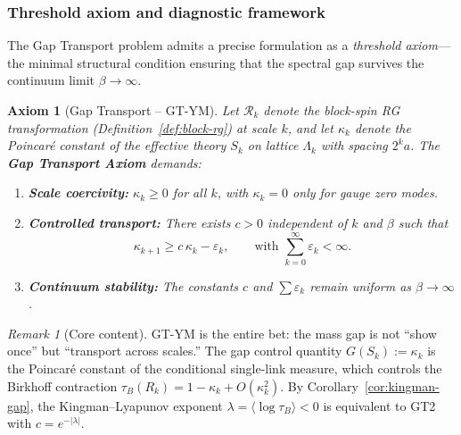 \documentclass[12pt,a4paper]{article}
\theoremstyle{definition}
\theoremstyle{plain}
\newtheorem{axiom}[definition]{Axiom}
\theoremstyle{remark}
\newtheorem{remark}[definition]{Remark}
\begin{document}
\subsubsection*{Threshold axiom and diagnostic framework}

The Gap Transport problem admits a precise formulation as a \emph{threshold axiom}---the minimal structural condition ensuring that the spectral gap survives the continuum limit $\beta \to \infty$.

\begin{axiom}[Gap Transport -- GT-YM]\label{ax:gt-ym}
Let $\mathcal{R}_k$ denote the block-spin RG transformation (Definition~\ref{def:block-rg}) at scale $k$, and let $\kappa_k$ denote the Poincar\'e constant of the effective theory $S_k$ on lattice $\Lambda_k$ with spacing $2^k a$. The \textbf{Gap Transport Axiom} demands:
\begin{enumerate}
\item[(GT1)] \textbf{Scale coercivity:} $\kappa_k \geq 0$ for all $k$, with $\kappa_k = 0$ only for gauge zero modes.
\item[(GT2)] \textbf{Controlled transport:} There exists $c > 0$ independent of $k$ and $\beta$ such that
\begin{equation}\label{eq:gap-transport}
  \kappa_{k+1} \geq c\, \kappa_k - \varepsilon_k, \qquad \text{with } \sum_{k=0}^{\infty} \varepsilon_k < \infty.
\end{equation}
\item[(GT3)] \textbf{Continuum stability:} The constants $c$ and $\sum \varepsilon_k$ remain uniform as $\beta \to \infty$.
\end{enumerate}
\end{axiom}

\begin{remark}[Core content]\label{rem:gt-core}
GT-YM is the entire bet: the mass gap is not ``show once'' but ``transport across scales.'' The gap control quantity $G(S_k) := \kappa_k$ is the Poincar\'e constant of the conditional single-link measure, which controls the Birkhoff contraction $\tau_B(R_k) = 1 - \kappa_k + O(\kappa_k^2)$. By Corollary~\ref{cor:kingman-gap}, the Kingman--Lyapunov exponent $\lambda = \langle \log \tau_B \rangle < 0$ is equivalent to GT2 with $c = e^{-|\lambda|}$.
\end{remark}
\end{document}
